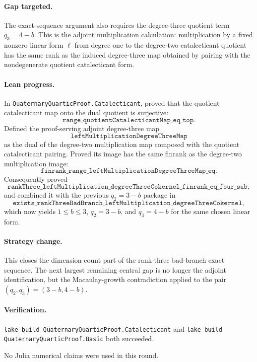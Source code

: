 \documentclass[11pt]{article}
\begin{document}
\paragraph{Gap targeted.}
The exact-sequence argument also requires the degree-three quotient term
\(q_3=4-b\).  This is the adjoint multiplication calculation: multiplication
by a fixed nonzero linear form \(\ell\) from degree one to the degree-two
catalecticant quotient has the same rank as the induced degree-three map
obtained by pairing with the nondegenerate quotient catalecticant form.

\paragraph{Lean progress.}
In \texttt{QuaternaryQuarticProof.Catalecticant}, proved that the quotient
catalecticant map onto the dual quotient is surjective:
\[
\texttt{range\_quotientCatalecticantMap\_eq\_top}.
\]
Defined the proof-serving adjoint degree-three map
\[
\texttt{leftMultiplicationDegreeThreeMap}
\]
as the dual of the degree-two multiplication map composed with the quotient
catalecticant pairing.  Proved its image has the same finrank as the
degree-two multiplication image:
\[
\texttt{finrank\_range\_leftMultiplicationDegreeThreeMap\_eq}.
\]
Consequently proved
\[
\texttt{rankThree\_leftMultiplication\_degreeThreeCokernel\_finrank\_eq\_four\_sub},
\]
and combined it with the previous \(q_2=3-b\) package in
\[
\texttt{exists\_rankThreeBadBranch\_leftMultiplication\_degreeThreeCokernel},
\]
which now yields \(1\le b\le3\), \(q_2=3-b\), and \(q_3=4-b\) for the same
chosen linear form.

\paragraph{Strategy change.}
This closes the dimension-count part of the rank-three bad-branch exact
sequence.  The next largest remaining central gap is no longer the adjoint
identification, but the Macaulay-growth contradiction applied to the pair
\((q_2,q_3)=(3-b,4-b)\).

\paragraph{Verification.}
\texttt{lake build QuaternaryQuarticProof.Catalecticant} and
\texttt{lake build QuaternaryQuarticProof.Basic} both succeeded.

No Julia numerical claims were used in this round.
\end{document}
